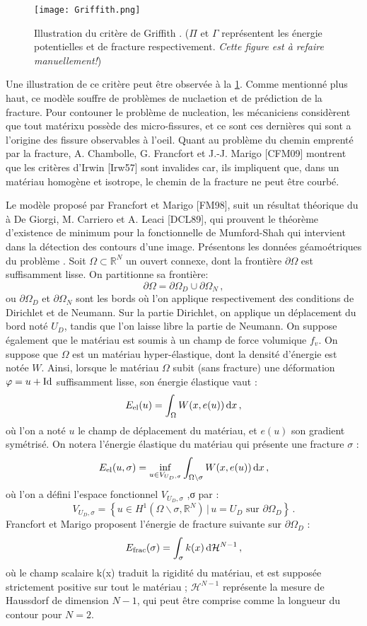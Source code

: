 \begin{figure}[!ht]
    \centering
    \texttt{[image: Griffith.png]}
    \caption{Illustration du critère de Griffith \parencite{gross2017fracture}. ($\Pi$ et $\Gamma$ représentent les énergie potentielles et de fracture respectivement. \textit{Cette figure est à refaire manuellement!})}
    \label{fig:Griffith}
\end{figure}
Une illustration de ce critère peut être observée à la \cref{fig:Griffith}. Comme mentionné plus haut, ce modèle souffre de problèmes de nuclaetion et de prédiction de la fracture. Pour contouner le problème de nucleation, les mécaniciens considèrent que tout matérixu possède des micro-fissures, et ce sont ces dernières qui sont a l'origine des fissure observables à l'oeil. Quant au problème du chemin emprenté par la fracture, A. Chambolle, G. Francfort et J.-J. Marigo [CFM09] montrent que les critères d'Irwin [Irw57] sont invalides car, ils impliquent que, dans un matériau homogène et isotrope, le chemin de la fracture ne peut être courbé.

Le modèle proposé par Francfort et Marigo [FM98], suit un résultat théorique du à De Giorgi, M. Carriero et A. Leaci [DCL89], qui prouvent le théorème d’existence de minimum pour la fonctionnelle de Mumford-Shah qui intervient dans la détection des contours d’une image. Présentons les données géamoétriques du problème \parencite[p.35]{balasoiu2020thesis}. Soit $\Omega \subset \mathbb{R}^N$ un ouvert connexe, dont la frontière $\partial \Omega$ est suffisamment lisse. On partitionne sa frontière:
$$
\partial \Omega = \partial \Omega_D \cup  \partial \Omega_N \,,
$$
ou $\partial \Omega_D$ et $\partial \Omega_N$ sont les bords où l’on applique respectivement des conditions de Dirichlet et de Neumann. Sur la partie Dirichlet, on applique un déplacement du bord noté $U_D$, tandis que l’on laisse libre la partie de Neumann. On suppose également que le matériau est soumis à un champ de force volumique $f_v$. On suppose que $\Omega$ est un matériau hyper-élastique, dont la densité d’énergie est notée $W$. Ainsi, lorsque le matériau $\Omega$ subit (sans fracture) une déformation $\varphi = u + \text{Id}$ suffisamment lisse, son énergie élastique vaut :
$$
\eel(u) = \int_{\Omega} W(x,e(u)) \diff x \,,
$$
où l’on a noté $u$ le champ de déplacement du matériau, et $e(u)$ son gradient symétrisé. On notera l’énergie élastique du matériau qui présente une fracture $\sigma$ :
$$
\eel(u,\sigma) = \inf_{u\in V_{U_D, \sigma}}{\int_{\Omega \backslash \sigma} W(x,e(u)) \diff x} \,,
$$
où l’on a défini l’espace fonctionnel $V_{U_D,\sigma}$ ,σ par :
$$
V_{U_D,\sigma} = \left\{ u \in H^1(\Omega \backslash \sigma, \mathbb{R}^N) \, \rvert \, u = U_D \text{ sur } \partial \Omega_D \right\} \,.
$$
Francfort et Marigo proposent l’énergie de fracture suivante sur $\partial \Omega_D$ :
$$
\efrac(\sigma) = \int_{\sigma} k(x) \diff \mathcal{H}^{N-1} \,,
$$
où le champ scalaire k(x) traduit la rigidité du matériau, et est supposée strictement positive sur tout le matériau ; $\mathcal{H}^{N-1}$ représente la mesure de Haussdorf de dimension $N-1$, qui peut être comprise comme la longueur du contour pour $N=2$.

